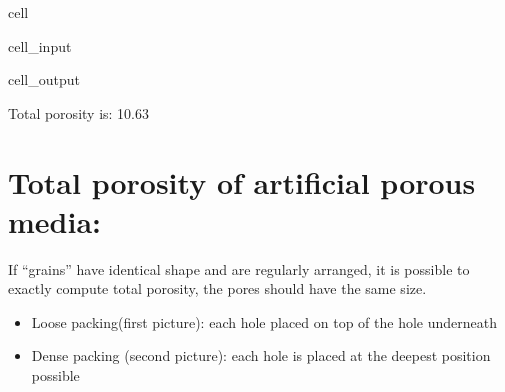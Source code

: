 \documentclass[letterpaper,10pt,english]{jupyterBook}
\let\sphinxpxdimen\pdfpxdimen\else\newdimen\sphinxpxdimen
\begin{document}
\begin{sphinxuseclass}{cell}\begin{sphinxVerbatimInput}

\begin{sphinxuseclass}{cell_input}
\begin{sphinxVerbatim}[commandchars=\\\{\}]
  
 


 
\end{sphinxVerbatim}

\end{sphinxuseclass}\end{sphinxVerbatimInput}
\begin{sphinxVerbatimOutput}

\begin{sphinxuseclass}{cell_output}
\begin{sphinxVerbatim}[commandchars=\\\{\}]
 Total porosity is: 10.63\PYGZpc{}
\end{sphinxVerbatim}

\end{sphinxuseclass}\end{sphinxVerbatimOutput}

\end{sphinxuseclass}

\section{Total porosity of artificial porous media:}
\label{\detokenize{content/flow/12_subsurface_structure:total-porosity-of-artificial-porous-media}}
\sphinxAtStartPar
If “grains” have identical shape and are regularly arranged, it is possible to exactly compute total porosity, the pores should have the same size.

\noindent{\hspace*{\fill}\sphinxincludegraphics[width=300\sphinxpxdimen]{{L02_fig5}.png}\hspace*{\fill}}
\begin{itemize}
\item {} 
\sphinxAtStartPar
Loose packing(first picture): each hole placed on top of the hole underneath

\item {} 
\sphinxAtStartPar
Dense packing (second picture): each hole is placed at the deepest position possible

\end{itemize}
\end{document}
